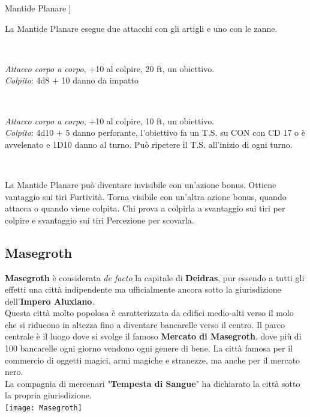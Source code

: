 \documentclass[10pt,twoside,onecolumn,openany]{book}
\begin{document}
\begin{multicols}{2}
\begin{monsterbox}{Mantide Planare}
	]
	\hline \\[1mm]
	\begin{monsteraction}[Multiattacco]
		La Mantide Planare esegue due attacchi con gli artigli e uno con le zanne.\\
	\end{monsteraction}\\
	\begin{monsteraction}[Artiglio]
		\textit{Attacco corpo a corpo}, +10 al colpire, 20 ft, un obiettivo.\\
		\textit{Colpito}: 4d8 + 10 danno da impatto
	\end{monsteraction}\\
	\begin{monsteraction}[Morso]
		\textit{Attacco corpo a corpo}, +10 al colpire, 10 ft, un obiettivo.\\
		\textit{Colpito}: 4d10 + 5 danno perforante, l'obiettivo fa un T.S. su CON con CD 17 o è avvelenato e 1D10 danno al turno. Può ripetere il T.S. all'inizio di ogni turno.
	\end{monsteraction}\\
	\begin{monsteraction}
		La Mantide Planare può diventare invisibile con un'azione bonus. Ottiene vantaggio sui tiri Furtività. Torna visibile con un'altra azione bonus, quando attacca o quando viene colpita. Chi prova a colpirla a svantaggio sui tiri per colpire e svantaggio sui tiri Percezione per scovarla.
	\end{monsteraction}
\end{monsterbox}
\end{multicols}
\newpage
\subsection{Masegroth}
\textbf{Masegroth} è considerata \textit{de facto} la capitale di \textbf{Deidras}, pur essendo a tutti gli effetti una città indipendente ma ufficialmente ancora sotto la giurisdizione dell'\textbf{Impero Aluxiano}.\\
Questa città molto popolosa è caratterizzata da edifici medio-alti verso il molo che si riducono in altezza fino a diventare bancarelle verso il centro. Il parco centrale è il luogo dove si svolge il famoso \textbf{Mercato di Masegroth}, dove più di 100 bancarelle ogni giorno vendono ogni genere di bene. La città famosa per il commercio di oggetti magici, armi magiche e stranezze, ma anche per il mercato nero.\\
La compagnia di mercenari "\textbf{Tempesta di Sangue}" ha dichiarato la città sotto la propria giurisdizione.\\
\texttt{[image: Masegroth]}
\end{document}
